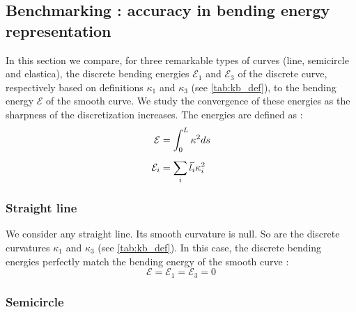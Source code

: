 \subsection{Benchmarking : accuracy in bending energy representation}

In this section we compare, for three remarkable types of curves (line, semicircle and elastica), the discrete bending energies $\mathcal{E}_1$ and $\mathcal{E}_3$ of the discrete curve, respectively based on definitions $\kappa_1$ and $\kappa_3$ (see \cref{tab:kb_def}), to the bending energy $\mathcal{E}$ of the smooth curve. We study the convergence of these energies as the sharpness of the discretization increases. The energies are defined as :
\begin{equation}
\setlength{\jot}{8pt}
\begin{aligned}
	\mathcal{E} &= \int_0^L \kappa^2 ds\\
	\mathcal{E}_i &= \sum_i \overbar{l_i} \kappa_i^2
\end{aligned}
\end{equation}

\subsubsection{Straight line}

We consider any straight line. Its smooth curvature is null. So are the discrete curvatures $\kappa_1$ and $\kappa_3$ (see \cref{tab:kb_def}). In this case, the discrete bending energies perfectly match the bending energy of the smooth curve :
\begin{equation}
	\mathcal{E} = \mathcal{E}_1 = \mathcal{E}_3 = 0
\end{equation}

\subsubsection{Semicircle}

